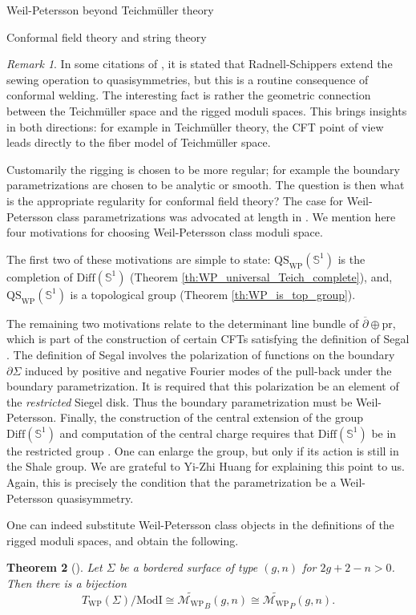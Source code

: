 \documentclass[12pt]{amsart}
\newcommand{\riem}{\Sigma}  %
\theoremstyle{plain}
\newtheorem{theorem}{Theorem}[section]
\theoremstyle{definition}
\theoremstyle{remark}
\newtheorem{remark}[theorem]{Remark}
\numberwithin{equation}{section} %
\numberwithin{figure}{section} %
\begin{document}
\begin{section}{Weil-Petersson beyond Teichm\"uller theory}
\begin{subsection}{Conformal field theory and string theory}
{
\begin{remark} In some citations of \cite{RadnellSchippers_monster}, it is stated that  Radnell-Schippers extend the sewing operation to quasisymmetries, but this is a routine consequence of conformal welding. The interesting fact is rather the geometric connection between the Teichm\"uller space and the rigged moduli spaces. This brings insights in both directions: for example in Teichm\"uller theory, the CFT point of view leads directly to the fiber model of Teichm\"uller space. 
\end{remark}}

Customarily the rigging is chosen to be more regular; for example the boundary parametrizations are chosen to be analytic or smooth. The question is then what is the appropriate regularity for conformal field theory? The case for Weil-Petersson class parametrizations was advocated at length in \cite{RadnellSchippersStaubach_CFT_review}. We mention here four motivations for choosing Weil-Petersson class moduli space. 

The first two of these motivations are simple to state: $\mathrm{QS}_{\mathrm{WP}}(\mathbb{S}^1)$ is the completion of $\mathrm{Diff}(\mathbb{S}^1)$ (Theorem \ref{th:WP_universal_Teich_complete}), and, $\mathrm{QS}_{\mathrm{WP}}(\mathbb{S}^1)$ is a topological group (Theorem \ref{th:WP_is_top_group}).  

The remaining two motivations relate to the determinant line bundle of $\overline{\partial} \oplus \mathrm{pr}$, which is part of the construction of certain CFTs satisfying the definition of Segal \cite{Huang}.  The definition of Segal involves the polarization of functions on the boundary $\partial \riem$ induced by positive and negative Fourier modes of the pull-back under the boundary parametrization. It is required that this polarization be an element of the {\it restricted} Siegel disk. Thus the boundary parametrization must be Weil-Petersson.  
Finally, the construction of the central extension of the group $\mathrm{Diff}(\mathbb{S}^1)$ and computation of the central charge requires that $\mathrm{Diff}(\mathbb{S}^1)$ be in the restricted group \cite[Appendix D]{Huang}. One can enlarge the group, but only if its action is still in the Shale group. 
{We are grateful to Yi-Zhi Huang for explaining this point to us.} Again, this is precisely the condition that the parametrization be a Weil-Petersson quasisymmetry. 

One can indeed substitute Weil-Petersson class objects in the definitions of the rigged moduli spaces, and obtain the following. 
\begin{theorem}[\cite{RSS_WP2}] \label{th:RMS_Teich_corresp_WP}
 Let $\riem$ be a bordered surface of type $(g,n)$ for $2g+2-n>0$. Then there is a bijection  
 \[  T_{\mathrm{WP}}(\riem)/\mathrm{ModI} \cong \widetilde{\mathcal{M}_{\mathrm{WP}}}_B(g,n)  \cong \widetilde{\mathcal{M}_{\mathrm{WP}}}_P(g,n).   \]


\end{theorem}
\end{subsection}
\end{section}
\end{document}
